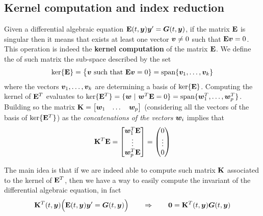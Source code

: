 \subsection{Kernel computation and index reduction}
	Given a differential algebraic equation $\mathbf{E}(t,\boldsymbol{y}) \boldsymbol{y}' = \boldsymbol{G}(t,\boldsymbol{y})$, if the matrix $\mathbf{E}$ is singular then it means that exists at least one vector $\boldsymbol{v} \neq 0$ such that $\mathbf{E} \boldsymbol{v} = 0$. This operation is indeed the \textbf{kernel computation} of the matrix $\mathbf{E}$. We define the  of such matrix the sub-space described by the set
	\[ \ker\{\mathbf{E}\} = \big\{ \boldsymbol{v} \textrm{ such that } \mathbf{E} \boldsymbol{v} = 0 \} = \textrm{span}\{\boldsymbol{v}_1, \dots , \boldsymbol{v}_k\}  \]
	where the vectors $\boldsymbol{v}_1,\dots, \boldsymbol{v}_k$ are determining a basis of $\ker\{\mathbf{E}\}$. Computing the kernel of $\mathbf{E}^T$ evaluates to $\ker\{\mathbf{E}^T\} = \{ \boldsymbol{w} \ | \ \boldsymbol{w}^T \mathbf{E} = 0 \} = \textrm{span}\{\boldsymbol{w}_1^T,\dots, \boldsymbol{w}_p^T\}$. Building so the matrix $\mathbf{K} = \begin{bmatrix} \boldsymbol{w}_1 & \dots & \boldsymbol{w}_p \end{bmatrix}$ (considering all the vectors of the basis of $\ker\{\mathbf{E}^T\}$) as the \textit{concatenations of the vectors $\boldsymbol{w}_i$} implies that
	\[ \mathbf{K}^T \mathbf{E} = \begin{bmatrix}  \boldsymbol{w}_1^T \mathbf{E} \\ \vdots \\ \boldsymbol{w}_p^T \mathbf{E}  \end{bmatrix} = \begin{pmatrix} 0 \\ \vdots  \\ 0 \end{pmatrix} \]
	
	The main idea is that if we are indeed able to compute such matrix $\mathbf{K}$ associated to the kernel of $\mathbf{E}^T$, then we have a way to easily compute the invariant of the differential algebraic equation, in fact 
	\[ \mathbf{K}^T(t,\boldsymbol{y})\Big(\mathbf{E}(t,\boldsymbol{y}) \boldsymbol{y}' = \boldsymbol{G}(t,\boldsymbol{y}) \Big) \qquad \Rightarrow \qquad \boldsymbol{0} = \mathbf{K}^T(t, \boldsymbol{y})  \boldsymbol{G}(t,\boldsymbol{y})\]
	
